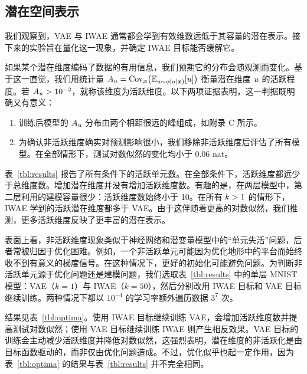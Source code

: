 \subsection{潜在空间表示}
\label{sec:latent}

我们观察到，VAE 与 IWAE 通常都会学到有效维数远低于其容量的潜在表示。接下来的实验旨在量化这一现象，并确定 IWAE 目标能否缓解它。




如果某个潜在维度编码了数据的有用信息，我们预期它的分布会随观测而变化。基于这一直觉，我们用统计量 $A_u=\mathrm{Cov}_{\bm{x}}\bigl(\mathbb{E}_{u\sim q(u|\bm{x})}[u]\bigr)$ 衡量潜在维度 $u$ 的活跃程度。若 $A_u>10^{-2}$，就称该维度为活跃维度。以下两项证据表明，这一判据既明确又有意义：
\begin{enumerate}
\item 训练后模型的 $A_u$ 分布由两个相距很远的峰组成，如附录 C 所示。
\item 为确认非活跃维度确实对预测影响很小，我们移除非活跃维度后评估了所有模型。在全部情形下，测试对数似然的变化均小于 $0.06$ nat。
\end{enumerate}


表~\ref{tbl:results} 报告了所有条件下的活跃单元数。在全部条件下，活跃维度都远少于总维度数。增加潜在维度并没有增加活跃维度数。有趣的是，在两层模型中，第二层利用的建模容量很少：活跃维度数始终小于 10。在所有 $k>1$ 的情形下，IWAE 学到的活跃潜在维度都多于 VAE。由于这伴随着更高的对数似然，我们推测，更多活跃维度反映了更丰富的潜在表示。




表面上看，非活跃维度现象类似于神经网络和潜变量模型中的“单元失活”问题，后者常被归因于优化困难。例如，一个非活跃单元可能因为优化地形中的平台而始终收不到有意义的梯度信号。在这种情况下，更好的初始化可能避免问题。为判断非活跃单元源于优化问题还是建模问题，我们选取表~\ref{tbl:results} 中的单层 MNIST 模型：VAE（$k=1$）与 IWAE（$k=50$），然后分别改用 IWAE 目标和 VAE 目标继续训练。两种情况下都以 $10^{-4}$ 的学习率额外遍历数据 $3^7$ 次。

结果见表~\ref{tbl:optima}。使用 IWAE 目标继续训练 VAE，会增加活跃维度数并提高测试对数似然；使用 VAE 目标继续训练 IWAE 则产生相反效果。VAE 目标的训练会主动减少活跃维度并降低对数似然，这强烈表明，潜在维度的非活跃化是由目标函数驱动的，而非仅由优化问题造成。不过，优化似乎也起一定作用，因为表~\ref{tbl:optima} 的结果与表~\ref{tbl:results} 并不完全相同。


